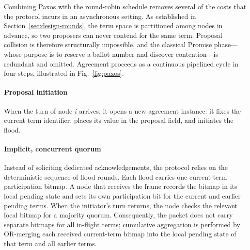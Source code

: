 \documentclass[journal]{IEEEtran}
\newcommand{\CI}{CI}                      %
\begin{document}

Combining Paxos with the round-robin schedule removes several of the
costs that the protocol incurs in an asynchronous setting. As established
in Section~\ref{sec:design-rounds}, the term space is partitioned among
nodes in advance, so two proposers can never contend for the same term.
Proposal collision is therefore structurally impossible, and the classical
Promise phase---whose purpose is to reserve a ballot number and discover
contention---is redundant and omitted. Agreement proceeds as a continuous
pipelined cycle in four steps, illustrated in Fig.~\ref{fig:paxos}.

\paragraph{Proposal initiation}
When the turn of node $i$ arrives, it opens a new agreement instance: it
fixes the current term identifier, places its value in the proposal field,
and initiates the flood.

\paragraph{Implicit, concurrent quorum}
Instead of soliciting dedicated acknowledgements, the protocol relies on
the deterministic sequence of flood rounds. Each flood carries one
current-term participation bitmap. A node that receives the frame records
the bitmap in its local pending state and sets its own participation bit
for the current and earlier pending terms. When the initiator's turn
returns, the node checks the relevant local bitmap for a majority quorum.
Consequently, the packet does not carry separate bitmaps for all in-flight
terms; cumulative aggregation is performed by OR-merging each received
current-term bitmap into the local pending state of that term and all
earlier terms.
\end{document}
